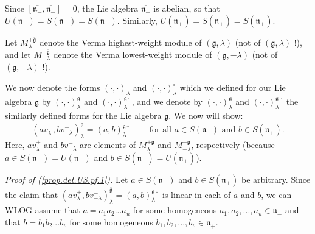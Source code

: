 \documentclass
[numbers=enddot,12pt,final,onecolumn,german,notitlepage]{scrartcl}%
\theoremstyle{definition}
\begin{document}
Since $\left[  \overline{\mathfrak{n}_{-}},\overline{\mathfrak{n}_{-}}\right]
=0$, the Lie algebra $\overline{\mathfrak{n}_{-}}$ is abelian, so that
$U\left(  \overline{\mathfrak{n}_{-}}\right)  =S\left(  \overline
{\mathfrak{n}_{-}}\right)  =S\left(  \mathfrak{n}_{-}\right)  $. Similarly,
$U\left(  \overline{\mathfrak{n}_{+}}\right)  =S\left(  \overline
{\mathfrak{n}_{+}}\right)  =S\left(  \mathfrak{n}_{+}\right)  $.

Let $M_{\lambda}^{+\overline{\mathfrak{g}}}$ denote the Verma highest-weight
module of $\left(  \overline{\mathfrak{g}},\lambda\right)  $ (not of $\left(
\mathfrak{g},\lambda\right)  $ !), and let $M_{-\lambda}^{-\overline
{\mathfrak{g}}}$ denote the Verma lowest-weight module of $\left(
\overline{\mathfrak{g}},-\lambda\right)  $ (not of $\left(  \mathfrak{g}%
,-\lambda\right)  $ !).

We now denote the forms $\left(  \cdot,\cdot\right)  _{\lambda}$ and $\left(
\cdot,\cdot\right)  _{\lambda}^{\circ}$ which we defined for our Lie algebra
$\mathfrak{g}$ by $\left(  \cdot,\cdot\right)  _{\lambda}^{\mathfrak{g}}$ and
$\left(  \cdot,\cdot\right)  _{\lambda}^{\mathfrak{g}\circ}$, and we denote by
$\left(  \cdot,\cdot\right)  _{\lambda}^{\overline{\mathfrak{g}}}$ and
$\left(  \cdot,\cdot\right)  _{\lambda}^{\overline{\mathfrak{g}}\circ}$ the
similarly defined forms for the Lie algebra $\overline{\mathfrak{g}}$. We now
will show:%
\begin{equation}
\left(  av_{\lambda}^{+},bv_{-\lambda}^{-}\right)  _{\lambda}^{\overline
{\mathfrak{g}}}=\left(  a,b\right)  _{\lambda}^{\mathfrak{g}\circ
}\ \ \ \ \ \ \ \ \ \ \text{for all }a\in S\left(  \mathfrak{n}_{-}\right)
\text{ and }b\in S\left(  \mathfrak{n}_{+}\right)  . \label{prop.det.US.pf.1}%
\end{equation}
Here, $av_{\lambda}^{+}$ and $bv_{-\lambda}^{-}$ are elements of $M_{\lambda
}^{+\overline{\mathfrak{g}}}$ and $M_{-\lambda}^{-\overline{\mathfrak{g}}}$,
respectively (because $a\in S\left(  \mathfrak{n}_{-}\right)  =U\left(
\overline{\mathfrak{n}_{-}}\right)  $ and $b\in S\left(  \mathfrak{n}%
_{+}\right)  =U\left(  \overline{\mathfrak{n}_{+}}\right)  $).

\textit{Proof of (\ref{prop.det.US.pf.1}).} Let $a\in S\left(  \mathfrak{n}%
_{-}\right)  $ and $b\in S\left(  \mathfrak{n}_{+}\right)  $ be arbitrary.
Since the claim that $\left(  av_{\lambda}^{+},bv_{-\lambda}^{-}\right)
_{\lambda}^{\overline{\mathfrak{g}}}=\left(  a,b\right)  _{\lambda
}^{\mathfrak{g}\circ}$ is linear in each of $a$ and $b$, we can WLOG assume
that $a=a_{1}a_{2}...a_{u}$ for some homogeneous $a_{1},a_{2},...,a_{u}%
\in\mathfrak{n}_{-}$ and that $b=b_{1}b_{2}...b_{v}$ for some homogeneous
$b_{1},b_{2},...,b_{v}\in\mathfrak{n}_{+}$.
\end{document}

